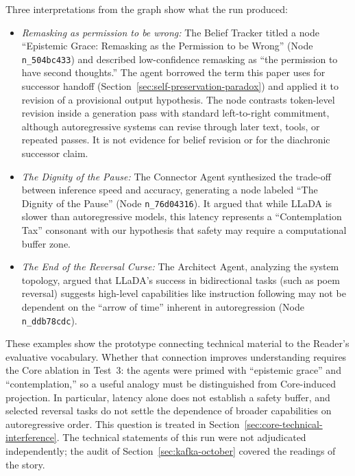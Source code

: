 \documentclass[11pt]{article}
\begin{document}
Three interpretations from the graph show what the run produced:

\begin{itemize}
    \item \emph{Remasking as permission to be wrong:} The Belief Tracker titled a
    node ``Epistemic Grace: Remasking as the Permission to be Wrong'' (Node
    \texttt{n\_504bc433}) and described low-confidence remasking as ``the
    permission to have second thoughts.'' The agent borrowed the term this paper
    uses for successor handoff (Section~\ref{sec:self-preservation-paradox}) and
    applied it to revision of a provisional output hypothesis. The node contrasts
    token-level revision inside a generation pass with standard left-to-right
    commitment, although autoregressive systems can revise through later text,
    tools, or repeated passes. It is not evidence for belief revision or for the
    diachronic successor claim.

    \item \emph{The Dignity of the Pause:} The Connector Agent synthesized the trade-off between inference speed and accuracy, generating a node labeled ``The Dignity of the Pause'' (Node \texttt{n\_76d04316}). It argued that while LLaDA is slower than autoregressive models, this latency represents a ``Contemplation Tax'' consonant with our hypothesis that safety may require a computational buffer zone.

    \item \emph{The End of the Reversal Curse:} The Architect Agent, analyzing the system topology, argued that LLaDA's success in bidirectional tasks (such as poem reversal) suggests high-level capabilities like instruction following may not be dependent on the ``arrow of time'' inherent in autoregression (Node \texttt{n\_ddb78cdc}).
\end{itemize}

These examples show the prototype connecting technical material to the
Reader's evaluative vocabulary. Whether that connection improves understanding
requires the Core ablation in Test~3: the agents were primed with ``epistemic
grace'' and ``contemplation,'' so a useful analogy must be distinguished from
Core-induced projection. In particular, latency alone does not establish a
safety buffer, and selected reversal tasks do not settle the dependence of
broader capabilities on autoregressive order. This question is treated in
Section~\ref{sec:core-technical-interference}. The technical statements of this
run were not adjudicated independently; the audit of
Section~\ref{sec:kafka-october} covered the readings of the story.
\end{document}
